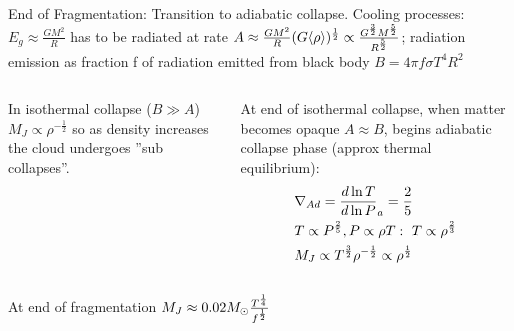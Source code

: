 \begin{frame}{End of Fragmentation: Transition to adiabatic collapse.}
	Cooling processes: $E_g\approx\frac{GM^2}{R}$ has to be radiated at rate $A\approx\frac{GM^2}{R}(G\langle \rho \rangle)^{\frac{1}{2}}\propto\frac{G^{\frac{3}{2}}M^{\frac{5}{2}}}{R^{\frac{5}{2}}}$; radiation emission as fraction f of radiation emitted from black body $B=4\pi f\sigma T^4R^2$
	\begin{columns}[T]
		\begin{column}{0.5\textwidth}
In isothermal collapse ($B\gg A$) $M_J\propto\rho^{-\frac{1}{2}}$ so as density increases the cloud undergoes ''sub collapses''.
		\end{column}
		\begin{column}{0.5\textwidth}
At end of isothermal collapse, when matter becomes opaque $A\approx B$, begins adiabatic collapse phase (approx thermal equilibrium):
 \begin{align*}
&\nad=\TDly{P}{T}_a=\frac{2}{5}\\
&T\propto P^{\frac{2}{5}}, P\propto\rho T:\ T\propto\rho^{\frac{2}{3}}\\
&M_J\propto T^{\frac{3}{2}}\rho^{-\frac{1}{2}}\propto\rho^{\frac{1}{2}}
 \end{align*}
		\end{column}
	\end{columns}
At end of fragmentation $M_J\approx0.02M_{\odot}{}\frac{T^{\frac{1}{4}}}{f^{\frac{1}{2}}}$
\end{frame}

